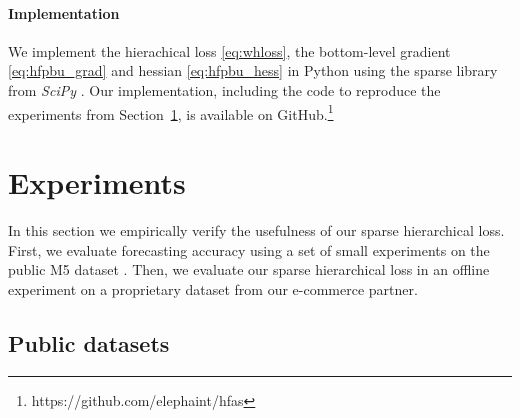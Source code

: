 \documentclass[preprint, 3p, times, twocolumn]{elsarticle}
\begin{document}

\paragraph{Implementation} We implement the hierachical loss \eqref{eq:whloss}, the bottom-level gradient \eqref{eq:hfpbu_grad} and hessian \eqref{eq:hfpbu_hess} in Python using the sparse library from \textit{SciPy} \cite{virtanen_scipy_2020}. Our implementation, including the code to reproduce the experiments from Section~\ref{sec:experiments}, is available on GitHub.\footnote{https://github.com/elephaint/hfas}

\section{Experiments}
  \label{sec:experiments}
  In this section we empirically verify the usefulness of our sparse hierarchical loss. First, we evaluate forecasting accuracy using a set of small experiments on the public M5 dataset \cite{makridakis_m5_2021}. Then, we evaluate our sparse hierarchical loss in an offline experiment on a proprietary dataset from our e-commerce partner.

  \subsection{Public datasets} \label{subsec:publicdatasets}
\end{document}
